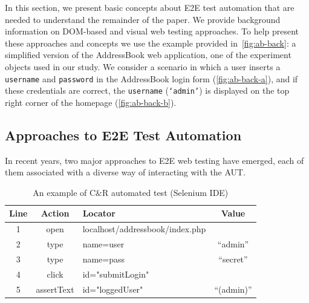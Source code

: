 In this section, we present basic concepts
about E2E test automation that are needed 
to understand the remainder of the paper.
We provide background information on 
DOM-based and visual web testing approaches.
To help present these approaches and concepts
we use the example provided in~\autoref{fig:ab-back}: 
a simplified version of the AddressBook web application, 
one of the experiment objects used in our study. 
We consider a scenario in which a user 
inserts a \texttt{username} and \texttt{password} 
in the AddressBook login form 
(\autoref{fig:ab-back-a}), 
and if these credentials are correct, 
the \texttt{username} (\texttt{`admin'}) is displayed on the top right corner of the homepage 
(\autoref{fig:ab-back-b}).

\subsection{Approaches to E2E Test Automation}
In recent years, two major approaches to E2E web testing have emerged, each of them associated with a diverse way of interacting with the AUT. 

\begin{table}[b]
\setlength{\tabcolsep}{3pt}
\renewcommand{\arraystretch}{1}
\centering
\caption{An example of C\&R automated test (Selenium IDE)}
\begin{tabular}{cclc}
\toprule
\textbf{Line} & \textbf{Action}   & \textbf{Locator} & \textbf{Value} \\
\midrule
1 & open             & localhost/addressbook/index.php &                \\
2 & type             & name=user                         &  ``admin''   \\
3 & type             & name=pass                         &  ``secret'' \\
4 & click            & id="submitLogin"                           &           \\
5 & assertText  & id="loggedUser"                           &   ``(admin)''        \\
\bottomrule
\end{tabular}
\label{t:seleniumtest}
\end{table}

